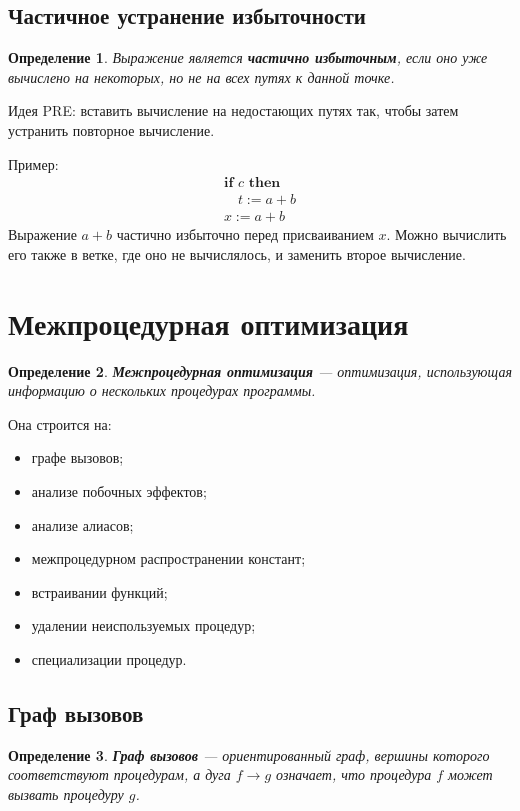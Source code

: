 \documentclass[12pt,a4paper]{article}
\newtheorem{definition}{Определение}
\begin{document}
\subsection{Частичное устранение избыточности}

\begin{definition}
Выражение является \textbf{частично избыточным}, если оно уже вычислено на некоторых, но не на всех путях к данной точке.
\end{definition}

Идея PRE: вставить вычисление на недостающих путях так, чтобы затем устранить повторное вычисление.

Пример:
\[
\begin{array}{l}
\textbf{if } c \textbf{ then}\\
\quad t:=a+b\\
x:=a+b
\end{array}
\]
Выражение $a+b$ частично избыточно перед присваиванием $x$. Можно вычислить его также в ветке, где оно не вычислялось, и заменить второе вычисление.

\section{Межпроцедурная оптимизация}

\begin{definition}
\textbf{Межпроцедурная оптимизация} --- оптимизация, использующая информацию о нескольких процедурах программы.
\end{definition}

Она строится на:
\begin{itemize}
    \item графе вызовов;
    \item анализе побочных эффектов;
    \item анализе алиасов;
    \item межпроцедурном распространении констант;
    \item встраивании функций;
    \item удалении неиспользуемых процедур;
    \item специализации процедур.
\end{itemize}

\subsection{Граф вызовов}

\begin{definition}
\textbf{Граф вызовов} --- ориентированный граф, вершины которого соответствуют процедурам, а дуга $f\to g$ означает, что процедура $f$ может вызвать процедуру $g$.
\end{definition}
\end{document}
